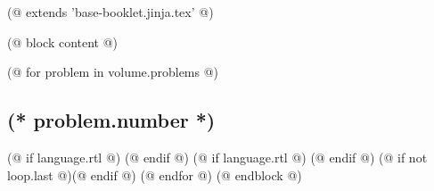 (@ extends 'base-booklet.jinja.tex' @)

(@ block content @)


    \pagestyle{online}

    (@ for problem in volume.problems @)%
        \setcounter{volume}{(* volume.number *)}%
        \setcounter{problem}{(* problem.number *)}%
        \subsection{\texorpdfstring{(* problem.number *)}{(* problem.number *). (* problem.id *)}}%
        \label{ssc:problem-(* problem.id*)}%
        (@ if language.rtl @) \arabicfont\setRL (@ endif @)
        (@ if language.rtl @) \unsetRL (@ endif @)
        (@ if not loop.last @)\newpage(@ endif @)
    (@ endfor @)
    \newpage
(@ endblock @)
